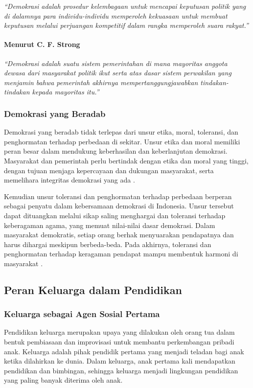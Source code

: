 \textit{“Demokrasi adalah prosedur kelembagaan untuk mencapai keputusan politik yang di dalamnya para individu-individu memperoleh kekuasaan untuk membuat keputusan melalui perjuangan kompetitif dalam rangka memperoleh suara rakyat.”}

\paragraph{Menurut C. F. Strong}

\textit{“Demokrasi adalah suatu sistem pemerintahan di mana mayoritas anggota dewasa dari masyarakat politik ikut serta atas dasar sistem perwakilan yang menjamin bahwa pemerintah akhirnya mempertanggungjawabkan tindakan-tindakan kepada mayoritas itu.”}

\subsubsection{Demokrasi yang Beradab}

Demokrasi yang beradab tidak terlepas dari unsur etika, moral, toleransi, dan penghormatan terhadap perbedaan di sekitar. Unsur etika dan moral memiliki peran besar dalam mendukung keberhasilan dan keberlanjutan demokrasi. Masyarakat dan pemerintah perlu bertindak dengan etika dan moral yang tinggi, dengan tujuan menjaga kepercayaan dan dukungan masyarakat, serta memelihara integritas demokrasi yang ada \cite{yusuf2024}.

Kemudian unsur toleransi dan penghormatan terhadap perbedaan berperan sebagai penyatu dalam kebersamaan demokrasi di Indonesia. Unsur tersebut dapat dituangkan melalui sikap saling menghargai dan toleransi terhadap keberagaman agama, yang memuat nilai-nilai dasar demokrasi. Dalam masyarakat demokratis, setiap orang berhak menyuarakan pendapatnya dan harus dihargai meskipun berbeda-beda. Pada akhirnya, toleransi dan penghormatan terhadap keragaman pendapat mampu membentuk harmoni di masyarakat \cite{widiawati2020}.


\subsection{Peran Keluarga dalam Pendidikan}

\subsubsection{Keluarga sebagai Agen Sosial Pertama}

Pendidikan keluarga merupakan upaya yang dilakukan oleh orang tua dalam bentuk pembiasaan dan improvisasi untuk membantu perkembangan pribadi anak. Keluarga adalah pihak pendidik pertama yang menjadi teladan bagi anak ketika dilahirkan ke dunia. Dalam keluarga, anak pertama kali mendapatkan pendidikan dan bimbingan, sehingga keluarga menjadi lingkungan pendidikan yang paling banyak diterima oleh anak.

